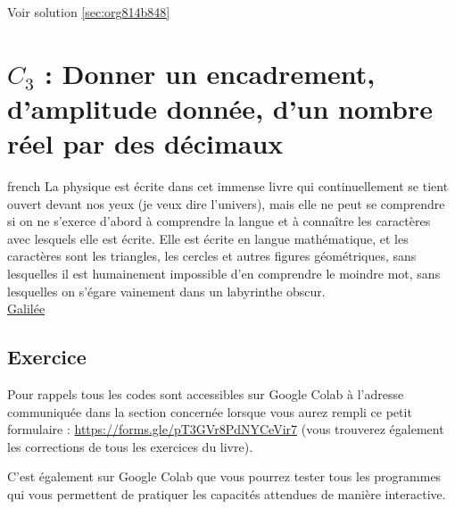 \documentclass[a4paper, 11pt, twoside]{book}
\begin{document}
Voir solution \ref{sec:org814b848}
\stopcontents[level-2]

\chapter{\(C_3\) : Donner un encadrement, d’amplitude donnée, d’un nombre réel par des décimaux}
\label{sec:orga688303}
\startcontents[level-2]

\begin{foreigndisplayquote}{french}
La physique est écrite dans cet immense livre qui continuellement
se tient ouvert devant nos yeux (je veux dire l'univers), mais elle
ne peut se comprendre si on ne s'exerce d'abord à comprendre la
langue et à connaître les caractères avec lesquels elle est
écrite. Elle est écrite en langue mathématique, et les caractères
sont les triangles, les cercles et autres figures géométriques,
sans lesquelles il est humainement impossible d'en comprendre le
moindre mot, sans lesquelles on s'égare vainement dans un
labyrinthe obscur.\\

\href{https://fr.wikipedia.org/wiki/Galil\%C3\%A9e\_(savant)}{Galilée}
\end{foreigndisplayquote}

\section{Exercice}
\label{sec:orgba6b593}
Pour rappels tous les codes sont accessibles sur Google Colab à
l'adresse communiquée dans la section concernée lorsque vous
aurez rempli ce petit formulaire :
\url{https://forms.gle/pT3GVr8PdNYCeVir7} (vous trouverez également
les corrections de tous les exercices du livre).

C'est également sur Google Colab que vous pourrez tester tous les
programmes qui vous permettent de pratiquer les capacités attendues
de manière interactive.
\end{document}
